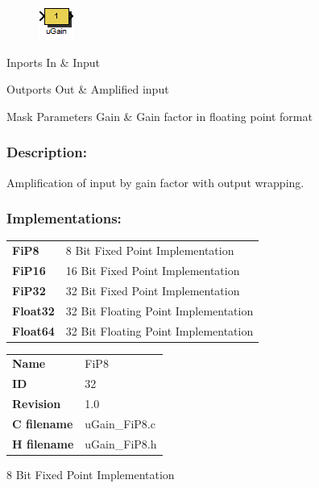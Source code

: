 \label{block:uGain}
\begin{figure}[H]\includegraphics{uGain}\end{figure} 

\begin{XtoCtabular}{Inports}
In & Input\tabularnewline
\hline
\end{XtoCtabular}


\begin{XtoCtabular}{Outports}
Out & Amplified input\tabularnewline
\hline
\end{XtoCtabular}

\begin{XtoCtabular}{Mask Parameters}
Gain & Gain factor in floating point format\tabularnewline
\hline
\end{XtoCtabular}

\subsubsection*{Description:}
Amplification of input by gain factor with output wrapping.

\subsubsection*{Implementations:}
\begin{tabular}{l l}
\textbf{FiP8} & 8 Bit Fixed Point Implementation\tabularnewline
\textbf{FiP16} & 16 Bit Fixed Point Implementation\tabularnewline
\textbf{FiP32} & 32 Bit Fixed Point Implementation\tabularnewline
\textbf{Float32} & 32 Bit Floating Point Implementation\tabularnewline
\textbf{Float64} & 32 Bit Floating Point Implementation\tabularnewline
\end{tabular}

\nopagebreak[0]
\begin{tabular}{l l}
\textbf{Name} & FiP8 \tabularnewline
\textbf{ID} & 32 \tabularnewline
\textbf{Revision} & 1.0 \tabularnewline
\textbf{C filename} & uGain\_FiP8.c \tabularnewline
\textbf{H filename} & uGain\_FiP8.h \tabularnewline
\end{tabular}
\vspace{1ex}

8 Bit Fixed Point Implementation

